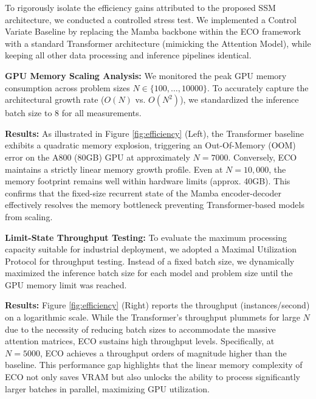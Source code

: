 \documentclass{article}
\theoremstyle{plain}
\theoremstyle{definition}
\theoremstyle{remark}
\begin{document}
To rigorously isolate the efficiency gains attributed to the proposed SSM architecture, we conducted a controlled stress test. We implemented a Control Variate Baseline by replacing the Mamba backbone within the ECO framework with a standard Transformer architecture (mimicking the Attention Model), while keeping all other data processing and inference pipelines identical.

\textbf{GPU Memory Scaling Analysis:} We monitored the peak GPU memory consumption across problem sizes $N \in \{100, \dots, 10000\}$. To accurately capture the architectural growth rate ($O(N)$ vs. $O(N^2)$), we standardized the inference batch size to 8 for all measurements.

\textbf{Results:} As illustrated in Figure \ref{fig:efficiency} (Left), the Transformer baseline exhibits a quadratic memory explosion, triggering an Out-Of-Memory (OOM) error on the A800 (80GB) GPU at approximately $N=7000$. Conversely, ECO maintains a strictly linear memory growth profile. Even at $N=10,000$, the memory footprint remains well within hardware limits (approx. 40GB). This confirms that the fixed-size recurrent state of the Mamba encoder-decoder effectively resolves the memory bottleneck preventing Transformer-based models from scaling.

\textbf{Limit-State Throughput Testing:} To evaluate the maximum processing capacity suitable for industrial deployment, we adopted a Maximal Utilization Protocol for throughput testing. Instead of a fixed batch size, we dynamically maximized the inference batch size for each model and problem size until the GPU memory limit was reached.

\textbf{Results:} Figure \ref{fig:efficiency} (Right) reports the throughput (instances/second) on a logarithmic scale. While the Transformer's throughput plummets for large $N$ due to the necessity of reducing batch sizes to accommodate the massive attention matrices, ECO sustains high throughput levels. Specifically, at $N=5000$, ECO achieves a throughput orders of magnitude higher than the baseline. This performance gap highlights that the linear memory complexity of ECO not only saves VRAM but also unlocks the ability to process significantly larger batches in parallel, maximizing GPU utilization.
\end{document}

